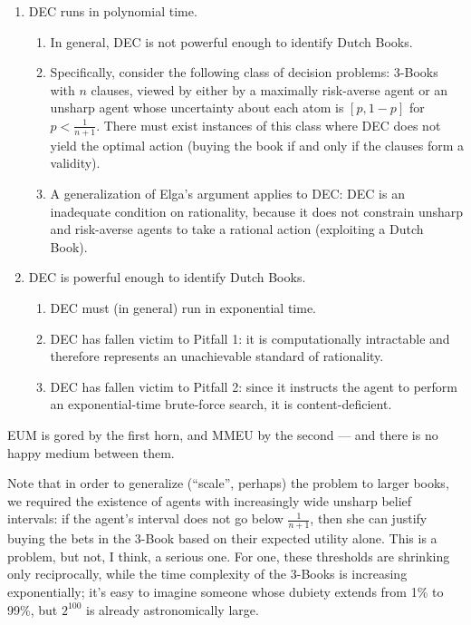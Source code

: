 \documentclass[letterpaper,12pt]{article}
\begin{document}
\begin{enumerate}
\item
DEC runs in polynomial time.
\begin{enumerate}
\item
In general, DEC is not powerful enough to identify Dutch Books.
\item
Specifically, consider the following class of decision problems: 3-Books with $n$ clauses, viewed by either by a maximally risk-averse agent or an unsharp agent whose uncertainty about each atom is $[p, 1-p]$ for $p < \frac{1}{n+1}$. There must exist instances of this class where DEC does not yield the optimal action (buying the book if and only if the clauses form a validity).
\item
A generalization of Elga's argument applies to DEC: DEC is an inadequate condition on rationality, because it does not constrain unsharp and risk-averse agents to take a rational action (exploiting a Dutch Book).
\end{enumerate}
\item
DEC is powerful enough to identify Dutch Books.
\begin{enumerate}
\item
DEC must (in general) run in exponential time.
\item
DEC has fallen victim to Pitfall 1: it is computationally intractable and therefore represents an unachievable standard of rationality.
\item
DEC has fallen victim to Pitfall 2: since it instructs the agent to perform an exponential-time brute-force search, it is content-deficient.
\end{enumerate}
\end{enumerate}

EUM is gored by the first horn, and MMEU by the second --- and there is no happy medium between them.

Note that in order to generalize (``scale'', perhaps) the problem to larger books, we required the existence of agents with increasingly wide unsharp belief intervals: if the agent's interval does not go below $\frac{1}{n+1}$, then she can justify buying the bets in the 3-Book based on their expected utility alone. This is a problem, but not, I think, a serious one. For one, these thresholds are shrinking only reciprocally, while the time complexity of the 3-Books is increasing exponentially; it's easy to imagine someone whose dubiety extends from 1\% to 99\%, but $2^{100}$ is already astronomically large.
\end{document}

